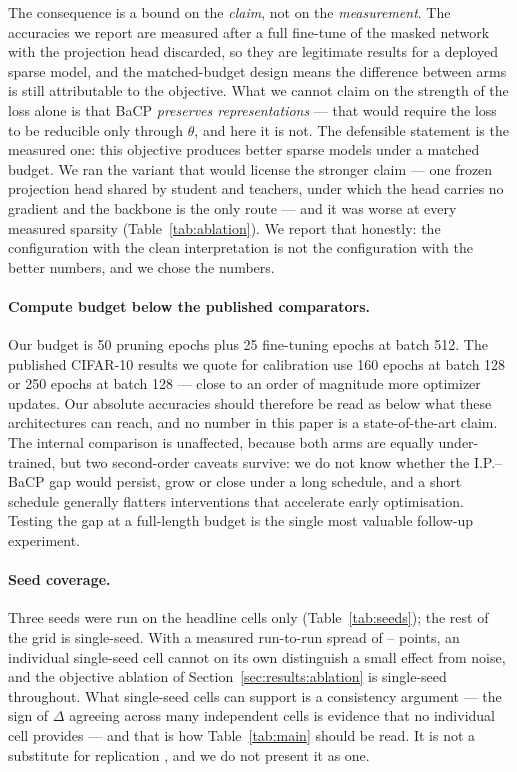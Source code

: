 The consequence is a bound on the \emph{claim}, not on the \emph{measurement}.
The accuracies we report are measured after a full fine-tune of the masked
network with the projection head discarded, so they are legitimate results for a
deployed sparse model, and the matched-budget design means the difference between
arms is still attributable to the objective. What we cannot claim on the strength
of the loss alone is that BaCP \emph{preserves representations} --- that would
require the loss to be reducible only through $\theta$, and here it is not. The
defensible statement is the measured one: this objective produces better sparse
models under a matched budget. We ran the variant that would license the stronger
claim --- one frozen projection head shared by student and teachers, under which
the head carries no gradient and the backbone is the only route --- and it was worse
at every measured sparsity (Table~\ref{tab:ablation}). We report that honestly:
the configuration with the clean interpretation is not the configuration with the
better numbers, and we chose the numbers.

\paragraph{Compute budget below the published comparators.}
Our budget is 50 pruning epochs plus 25 fine-tuning epochs at batch 512. The
published CIFAR-10 results we quote for calibration use 160 epochs at batch 128
\citep{liu2021granet} or 250 epochs at batch 128 \citep{li2025east} --- close to an
order of magnitude more optimizer updates. Our absolute accuracies should
therefore be read as below what these architectures can reach, and no number in
this paper is a state-of-the-art claim. The internal comparison is unaffected,
because both arms are equally under-trained, but two second-order caveats survive:
we do not know whether the I.P.--BaCP gap would persist, grow or close under a
long schedule, and a short schedule generally flatters interventions that
accelerate early optimisation. Testing the gap at a full-length budget is the
single most valuable follow-up experiment.

\paragraph{Seed coverage.}
Three seeds were run on the headline cells only (Table~\ref{tab:seeds}); the rest
of the grid is single-seed. With a measured run-to-run spread of
-- points, an
individual single-seed cell cannot on its own distinguish a small effect from
noise, and the objective ablation of Section~\ref{sec:results:ablation} is
single-seed throughout. What single-seed cells can support is a consistency
argument --- the sign of $\Delta$ agreeing across many independent cells is
evidence that no individual cell provides --- and that is how Table~\ref{tab:main}
should be read. It is not a substitute for replication
\citep{bouthillier2021variance}, and we do not present it as one.

